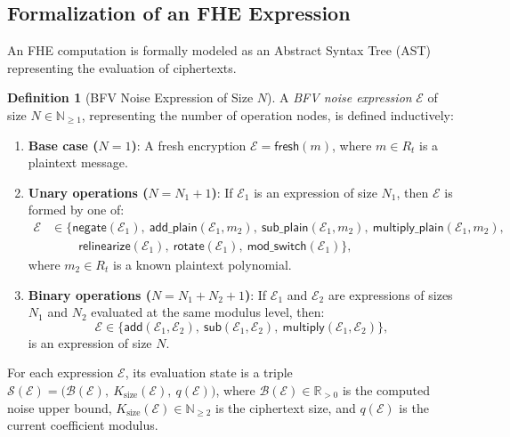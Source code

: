 \documentclass[11pt]{article}
\theoremstyle{definition}
\newtheorem*{definition*}{Definition}
\theoremstyle{remark}
\begin{document}
\subsection*{Formalization of an FHE Expression}

An FHE computation is formally modeled as an Abstract Syntax Tree (AST) representing the evaluation of ciphertexts.

\begin{definition*}[BFV Noise Expression of Size $N$]
A \emph{BFV noise expression} $\mathcal{E}$ of size $N \in \mathbb{N}_{\geq 1}$, representing the number of operation nodes, is defined inductively:
\begin{enumerate}[leftmargin=2em]
\item \textbf{Base case ($N=1$)}: A fresh encryption $\mathcal{E} = \mathsf{fresh}(m)$, where $m \in R_t$ is a plaintext message.
\item \textbf{Unary operations ($N = N_1 + 1$)}: If $\mathcal{E}_1$ is an expression of size $N_1$, then $\mathcal{E}$ is formed by one of:
      \begin{align*}
        \mathcal{E} &\in \bigl\{ \mathsf{negate}(\mathcal{E}_1),\ \mathsf{add\_plain}(\mathcal{E}_1, m_2),\ \mathsf{sub\_plain}(\mathcal{E}_1, m_2),\ \mathsf{multiply\_plain}(\mathcal{E}_1, m_2), \\
        &\qquad\ \mathsf{relinearize}(\mathcal{E}_1),\ \mathsf{rotate}(\mathcal{E}_1),\ \mathsf{mod\_switch}(\mathcal{E}_1) \bigr\},
      \end{align*}
      where $m_2 \in R_t$ is a known plaintext polynomial.
\item \textbf{Binary operations ($N = N_1 + N_2 + 1$)}: If $\mathcal{E}_1$ and $\mathcal{E}_2$ are expressions of sizes $N_1$ and $N_2$ evaluated at the same modulus level, then:
      \[
        \mathcal{E} \in \bigl\{ \mathsf{add}(\mathcal{E}_1, \mathcal{E}_2),\ \mathsf{sub}(\mathcal{E}_1, \mathcal{E}_2),\ \mathsf{multiply}(\mathcal{E}_1, \mathcal{E}_2) \bigr\},
      \]
      is an expression of size $N$.
\end{enumerate}
For each expression $\mathcal{E}$, its evaluation state is a triple
$\mathcal{S}(\mathcal{E}) = \bigl(\mathcal{B}(\mathcal{E}),\ K_{\mathrm{size}}(\mathcal{E}),\ q(\mathcal{E})\bigr)$,
where $\mathcal{B}(\mathcal{E}) \in \mathbb{R}_{>0}$ is the computed noise upper bound, $K_{\mathrm{size}}(\mathcal{E}) \in \mathbb{N}_{\geq 2}$ is the ciphertext size, and $q(\mathcal{E})$ is the current coefficient modulus.
\end{definition*}
\end{document}
